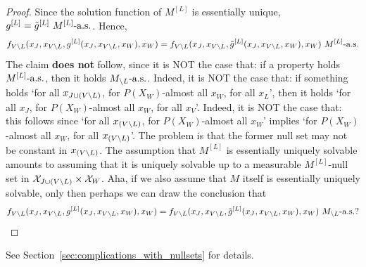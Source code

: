 \begin{proof}
  Since the solution function of $M^{[L]}$ is essentially unique, $g^{[L]} = \tilde{g}^{[L]}\ M^{[L]}\text{-a.s.}$.
  Hence, 
  $$f_{V \setminus L}(x_{J},x_{V \setminus L},g^{[L]}(x_{J},x_{V \setminus L},x_{W}),x_{W}) = f_{V \setminus L}(x_{J},x_{V \setminus L},\tilde g^{[L]}(x_{J},x_{V \setminus L},x_{W}),x_{W})\ M^{[L]}\text{-a.s.}$$
  The claim \textbf{does not} follow, since it is NOT the case that: if a property holds $M^{[L]}\text{-a.s.}$, then it holds $M_{\setminus L}\text{-a.s.}$.
  Indeed, it is NOT the case that: if something holds `for all $x_{J \cup (V\setminus L)}$, for $P(X_W)$-almost all $x_W$, for all $x_L$', then it holds `for all $x_J$, for $P(X_W)$-almost all $x_W$, for all $x_V$'.
  Indeed, it is NOT the case that: this follows since `for all $x_{(V\setminus L)}$, for $P(X_W)$-almost all $x_W$' implies `for $P(X_W)$-almost all $x_W$, for all $x_{(V\setminus L)}$'.
  The problem is that the former null set may not be constant in $x_{(V\setminus L)}$.
  The assumption that $M^{[L]}$ is essentially uniquely solvable amounts to assuming that it is uniquely solvable up to a measurable $M^{[L]}$-null set in $\mathcal{X}_{J \cup (V\setminus L)} \times \mathcal{X}_W$.
  Aha, if we also assume that $M$ itself is essentially uniquely solvable, only then perhaps we can draw the conclusion that 
  $$f_{V \setminus L}(x_{J},x_{V \setminus L},g^{[L]}(x_{J},x_{V \setminus L},x_{W}),x_{W}) = f_{V \setminus L}(x_{J},x_{V \setminus L},\tilde g^{[L]}(x_{J},x_{V \setminus L},x_{W}),x_{W})\ M_{\setminus L}\text{-a.s.}?$$

\end{proof}
See Section~\ref{sec:complications_with_nullsets} for details.

